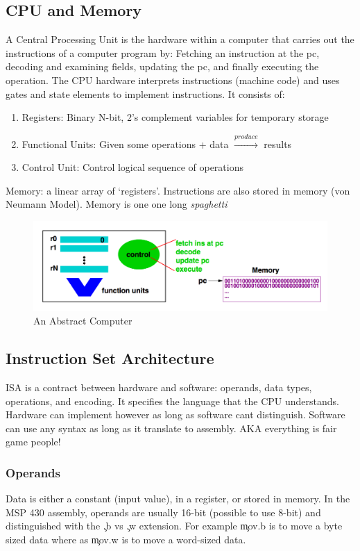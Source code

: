 \documentclass{hw}
\begin{document}
\subsection{CPU and Memory}
A Central Processing Unit is the hardware within a computer that carries out the
instructions of a computer program by: Fetching an instruction at the pc, decoding and 
examining fields, updating the pc, and finally executing the operation. The CPU 
hardware interprets instructions (machine code) and uses gates and state elements to implement 
instructions. It consists of:
\begin{enumerate}
\item Registers: Binary N-bit, 2's complement variables for temporary storage
\item Functional Units: Given some operations + data $\xrightarrow{produce}$ results
\item Control Unit: Control logical sequence of operations
\end{enumerate}

Memory: a linear array of `registers'. Instructions are also stored in memory 
(von Neumann Model). Memory is one one long \emph{spaghetti}

\begin{figure}[H]
  \centering
  \includegraphics[scale=.7]{absComp}
  \caption{An Abstract Computer}
\end{figure}


\subsection{Instruction Set Architecture}
ISA is a contract between hardware and software: operands, data types, operations,
and encoding. It specifies the language that the CPU understands. Hardware can 
implement however as long as software cant distinguish. Software can use any syntax
as long as it translate to assembly. AKA everything is fair game people!

\subsubsection{Operands}
Data is either a constant (input value), in a register, or stored in memory. In 
the MSP 430 assembly, operands are usually 16-bit (possible to use 8-bit) and
distinguished with the \c{.b} vs \c{.w} extension. For example \c{mov.b} is to move a byte 
sized data where as \c{mov.w} is to move a word-sized data.
\end{document}
